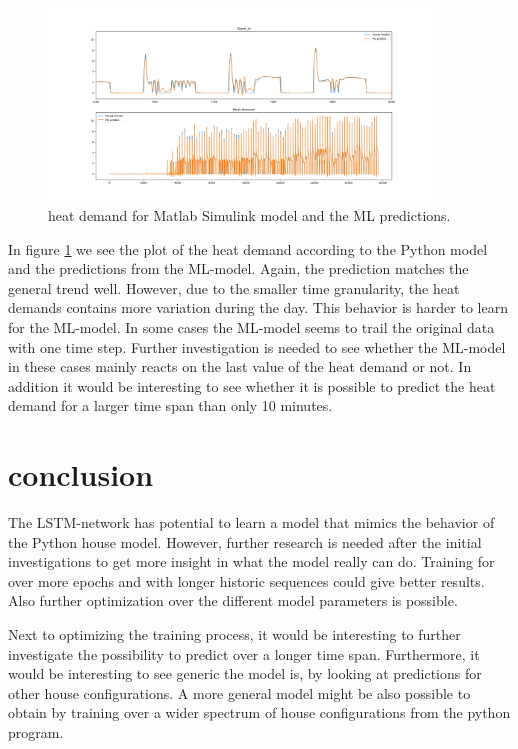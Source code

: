 \begin{figure}
	\centering
		\includegraphics[width = 0.9\textwidth]{figures/seq_84_epoch_1000_Python1.png}
		\caption{heat demand for Matlab Simulink model and the ML predictions.}
	\label{fig:python_seq84}
\end{figure}

In figure \ref{fig:python_seq84} we see the plot of the heat demand according to the Python model and the predictions from the ML-model. Again, the prediction matches the general trend well. However, due to the smaller time granularity, the heat demands contains more variation during the day. This behavior is harder to learn for the ML-model. In some cases the ML-model seems to trail the original data with one time step. Further investigation is needed to see whether the ML-model in these cases mainly reacts on the last value of the heat demand or not. In addition it would be interesting to see whether it is possible to predict the heat demand for a larger time span than only 10 minutes. 

\section{conclusion}
The LSTM-network has potential to learn a model that mimics the behavior of the Python house model. However, further research is needed after the initial investigations to get more insight in what the model really can do. Training for over more epochs and with longer historic sequences could give better results.  Also further optimization over the different model parameters is possible. 

Next to optimizing the training process, it would be interesting to further investigate the possibility to predict over a longer time span. Furthermore, it would be interesting to see generic the model is, by looking at predictions for other house configurations. A more general model might be also possible to obtain by training over a wider spectrum of house configurations from the python program. 

